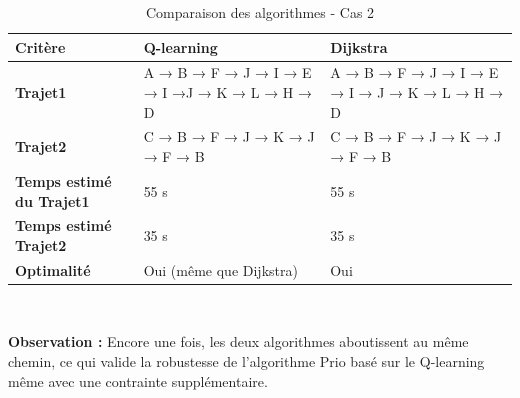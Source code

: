 \documentclass{article}
\begin{document}
\begin{table}[H]
    \begin{tabularx}{\linewidth}{|X|X|X|}
        \hline
        \textbf{Critère} & \textbf{Q-learning} & \textbf{Dijkstra} \\
        \hline
        \textbf{Trajet1} & A → B → F → J → I → E → I →J → K → L → H → D & A → B → F → J → I → E → I → J → K → L → H → D \\
        \hline
        \textbf{Trajet2} & C → B → F → J → K → J → F → B & C → B → F → J → K → J → F → B \\
       \hline
        \textbf{Temps estimé du Trajet1} & 55 s & 55 s \\
        \hline
        \textbf{Temps estimé Trajet2} & 35 s & 35 s \\
         \hline
        \textbf{Optimalité} & Oui (même que Dijkstra) & Oui \\
        \hline
    \end{tabularx} \\
  \caption{Comparaison des algorithmes - Cas 2}
\vspace{0.25cm} 
\hspace{1cm} 
\textbf{Observation :} Encore une fois, les deux algorithmes aboutissent au même chemin, ce qui valide la robustesse de l'algorithme Prio basé sur le Q-learning même avec une contrainte supplémentaire.
  
\end{table}
\end{document}
